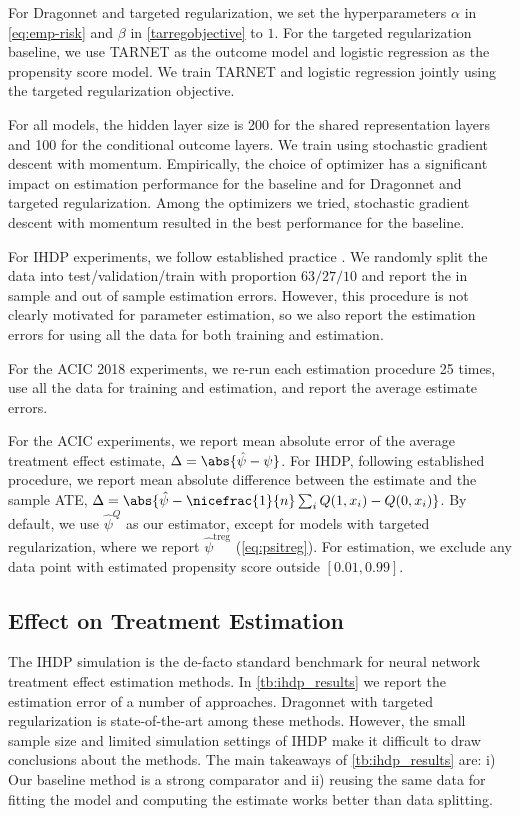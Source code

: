 \documentclass{article}
\begin{document}
For Dragonnet and targeted regularization, we set the hyperparameters $\alpha$ in \cref{eq:emp-risk} and $\beta$ in \cref{tarregobjective} to $1$.
For the targeted regularization baseline,
we use TARNET as the outcome model and logistic regression as the propensity score model.
We train TARNET and logistic regression jointly using the targeted regularization objective.

For all models, the hidden layer size is 200 for the shared representation layers and 100 for the conditional outcome layers.
We train using stochastic gradient descent with momentum.
Empirically, the choice of optimizer has a significant impact on estimation performance
for the baseline and for Dragonnet and targeted regularization.
Among the optimizers we tried, stochastic gradient descent with momentum resulted in the best performance for the baseline.

For IHDP experiments, we follow established practice \citep[e.g.][]{shalit2016estimating}. We randomly split the data into test/validation/train with proportion $63/27/10$ and report the in sample and out of sample estimation errors.
However, this procedure is not clearly motivated for parameter estimation, so we also report the estimation errors for using all the data for both training and estimation. 

For the ACIC 2018 experiments, we re-run each estimation procedure 25 times, use all the data for training and estimation, and report the average estimate errors.


For the ACIC experiments, 
we report mean absolute error of the average treatment effect estimate,
$\Delta = \abs{\hat{\psi} - \psi}$. For IHDP, following established procedure,
we report mean absolute difference between the estimate and the sample ATE,
$\Delta = \abs{\hat{\psi} - \nicefrac{1}{n} \sum_i Q(1,x_i) - Q(0,x_i)}$.
By default, we use $\hat{\psi}^Q$ as our estimator,
except for models with targeted regularization, where we report $\hat{\psi}^{\mathrm{treg}}$ (\cref{eq:psitreg}).
For estimation, we exclude any data point with estimated propensity score outside $[0.01, 0.99]$.

\subsection{Effect on Treatment Estimation}
 
 
The IHDP simulation is the de-facto standard benchmark for neural network treatment effect estimation methods.
In \cref{tb:ihdp_results} we report the estimation error of a number of approaches.
Dragonnet with targeted regularization is state-of-the-art among these methods.
However, the small sample size and limited simulation settings of IHDP make it difficult to draw
conclusions about the methods.
The main takeaways of \cref{tb:ihdp_results} are: i) Our baseline method is a strong comparator and ii) reusing the same data for fitting the model and computing the estimate
works better than data splitting.
\end{document}
